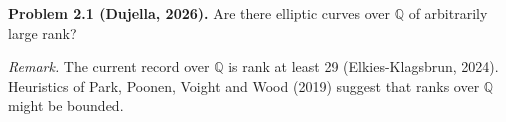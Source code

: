 \textbf{Problem 2.1 (Dujella, 2026).} Are there elliptic curves over $\mathbb{Q}$ of arbitrarily large rank?

\medskip

\textit{Remark.} The current record over $\mathbb{Q}$ is rank at least 29 (Elkies-Klagsbrun, 2024). Heuristics of Park, Poonen, Voight and Wood (2019) suggest that ranks over $\mathbb{Q}$ might be bounded.
